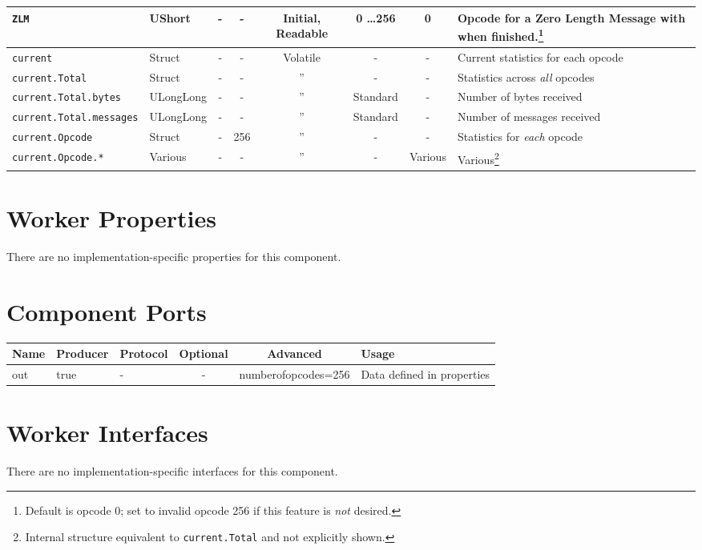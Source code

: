 \begin{landscape}
\begin{scriptsize}
\begin{minipage}{\textwidth}
\begin{tabular}{|p{3cm}|p{1.5cm}|c|c|c|c|c|p{7cm}|}
				\verb+ZLM+ &
				UShort &
				- &
				- &
				Initial, Readable\footnotemark[\thefnreadable] &
				0 \ldots 256 &
				0 &
				Opcode for a \textbf{Z}ero \textbf{L}ength \textbf{M}essage with when finished.\footnote{Default is opcode 0; set to invalid opcode 256 if this feature is \textit{not} desired.} \\
				\hline
				\verb+current+ &
				Struct &
				- &
				- &
				Volatile &
				- &
				- &
				Current statistics for each opcode \\
				\hline
				\verb+current.Total+ &
				Struct &
				- &
				- &
				'' &
				- &
				- &
				Statistics across \textit{all} opcodes \\
				\hline
				\verb+current.Total.bytes+ &
				ULongLong &
				- &
				- &
				'' &
				Standard &
				- &
				Number of bytes received \\
				\hline
				\verb+current.Total.messages+ &
				ULongLong &
				- &
				- &
				'' &
				Standard &
				- &
				Number of messages received \\
				\hline
				\verb+current.Opcode+ &
				Struct &
				- &
				256 &
				'' &
				- &
				- &
				Statistics for \textit{each} opcode \\
				\hline
				\verb+current.Opcode.*+ &
				Various &
				- &
				- &
				'' &
				- &
				Various &
				Various\footnote{Internal structure equivalent to \texttt{current.Total} and not explicitly shown.} \\
				\hline
			\end{tabular}
		\end{minipage}
	\end{scriptsize}
	\section*{Worker Properties}
	There are no implementation-specific properties for this component.

	\section*{Component Ports}
	\begin{scriptsize}
		\begin{tabular}{|M{2cm}|M{1.5cm}|M{4cm}|c|c|M{9cm}|}
			\hline
			Name & Producer & Protocol & Optional & Advanced            & Usage                      \\
			\hline
			out  & true     & -        & -        & numberofopcodes=256 & Data defined in properties \\
			\hline
		\end{tabular}
	\end{scriptsize}

	\section*{Worker Interfaces}
	There are no implementation-specific interfaces for this component.

\end{landscape}
\iffalse
